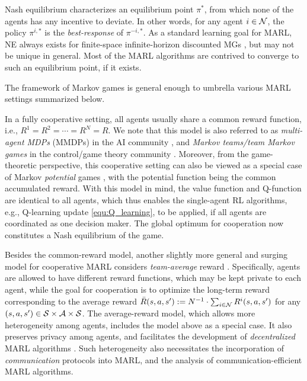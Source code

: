 Nash equilibrium characterizes an equilibrium  point $\pi^*$, from which none of the agents has any  incentive to deviate. In other words, for any agent $i\in\mathcal{N}$, the policy $\pi^{i,*} $ is the \emph{best-response} of $\pi^{-i,*}$. As a standard learning goal for MARL, NE always exists for finite-space infinite-horizon discounted MGs \cite{filar2012competitive}, but 
may not be unique in general.  Most of the MARL algorithms are contrived to converge to such an equilibrium point, if it exists. 



The framework of Markov games is general enough to umbrella various MARL settings summarized below. 

\vspace{7pt}
\vspace{5pt}


In a fully cooperative setting, all agents usually share a common reward function, i.e., $R^1=R^2=\cdots=R^N=R$. 
We note that this model is also  referred to as \emph{multi-agent MDPs} (MMDPs)  in the  AI community \cite{boutilier1996planning,lauer2000algorithm}, and \emph{Markov teams/team Markov games}   in the control/game theory community \cite{yoshikawa1978decomposition,ho1980team,wang2003reinforcement,mahajan2008sequential}. Moreover, from the game-theoretic perspective, this cooperative setting can also be viewed as a special case of Markov \emph{potential} games \cite{gonzalez2013discrete,zazo2016dynamic,valcarcel2018learning}, with the potential function being the common accumulated reward. 
With this model in mind, the value function and Q-function are identical to all agents, which thus enables the single-agent RL algorithms, e.g., Q-learning update \eqref{equ:Q_learning}, to be applied, if all agents are coordinated as one decision maker.  
 The global optimum for cooperation now constitutes a Nash equilibrium of the game.  

Besides the common-reward model, another slightly more general and surging model for cooperative MARL considers  \emph{team-average}  reward \cite{kar2013cal,zhang2018fully,doan2019finitea}. Specifically, agents are allowed to have different reward functions, which may be kept private to each agent, while the goal for cooperation is to optimize  the long-term reward corresponding to the average reward $\bar{R}(s,a,s'):=N^{-1}\cdot \sum_{i\in\mathcal{N}}R^i(s,a,s')$ for any $(s,a,s')\in{\mathcal{S}}\times\mathcal{A}\times{\mathcal{S}}$. The average-reward model, which allows more heterogeneity among agents, includes the model above as a special case.   It also   preserves   privacy among agents, and  facilitates  the development of  \emph{decentralized} MARL algorithms \cite{kar2013cal,zhang2018fully,wai2018multi}. Such heterogeneity also necessitates  the incorporation of \emph{communication} protocols  into MARL, and the analysis of communication-efficient MARL algorithms.


